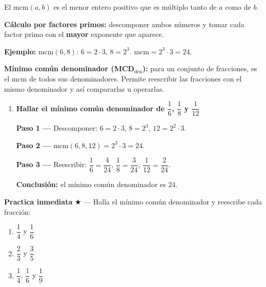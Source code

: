 \documentclass[11pt, letterpaper]{article}
\begin{document}
\begin{tcolorbox}[importantbox, title={Recordatorio de MCM (Gu\'ia 3 --- N\'umeros Enteros)}]
El $\text{mcm}(a,b)$ es el menor entero positivo que es m\'ultiplo tanto de $a$ como de $b$.

\medskip

\noindent\textbf{C\'alculo por factores primos:} descomponer ambos n\'umeros y tomar cada factor primo con el \textbf{mayor} exponente que aparece.

\medskip

\noindent\textbf{Ejemplo:} $\text{mcm}(6,8)$: \quad $6=2\cdot3$, \quad $8=2^3$. \quad $\text{mcm}=2^3\cdot3=24$.

\medskip

\noindent\textbf{M\'inimo com\'un denominador (MCD$_{\text{den}}$):} para un conjunto de fracciones, es el $\text{mcm}$ de todos sus denominadores. Permite reescribir las fracciones con el mismo denominador y as\'i compararlas u operarlas.
\end{tcolorbox}

\begin{tcolorbox}[examplebox, title={Ejemplos --- hallar el m\'inimo com\'un denominador}]
\begin{enumerate}[label=\textbf{Ej. \arabic*.}, leftmargin=*, itemsep=12pt]

\item \textbf{Hallar el m\'inimo com\'un denominador de $\dfrac{1}{6}$, $\dfrac{1}{8}$ y $\dfrac{1}{12}$}

\textbf{Paso 1 ---} Descomponer: $6=2\cdot3$, $8=2^3$, $12=2^2\cdot3$.

\textbf{Paso 2 ---} $\text{mcm}(6,8,12) = 2^3 \cdot 3 = 24$.

\textbf{Paso 3 ---} Reescribir:
$\dfrac{1}{6}=\dfrac{4}{24}$, \quad
$\dfrac{1}{8}=\dfrac{3}{24}$, \quad
$\dfrac{1}{12}=\dfrac{2}{24}$.

\textbf{Conclusi\'on:} el m\'inimo com\'un denominador es $24$. \checkmark

\end{enumerate}
\end{tcolorbox}

\medskip
\textbf{Practica inmediata} \quad $\bigstar$ --- Halla el m\'inimo com\'un denominador y reescribe cada fracci\'on:
\begin{enumerate}[label=\alph*), leftmargin=*]
  \item $\dfrac{1}{4}$ y $\dfrac{1}{6}$
  \item $\dfrac{2}{3}$ y $\dfrac{3}{5}$
  \item $\dfrac{1}{4}$, $\dfrac{1}{6}$ y $\dfrac{1}{9}$
\end{enumerate}
\end{document}
